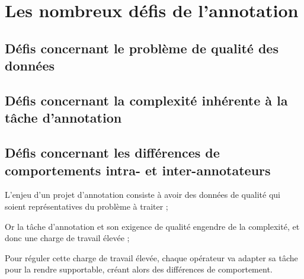 \section{Les nombreux défis de l'annotation}
\label{section:2.3-DEFIS-ANNOTATION}

	
	
	
	\subsection{Défis concernant le problème de qualité des données}
	\label{section:2.3.1-DEFIS-ANNOTATION-ASPECT-DONNEES}
	
	
	\subsection{Défis concernant la complexité inhérente à la tâche d'annotation}
	\label{section:2.3.2-DEFIS-ANNOTATION-ASPECT-COMPLEXITE}
	
	
	\subsection{Défis concernant les différences de comportements intra- et inter-annotateurs}
	\label{section:2.3.3-DEFIS-ANNOTATION-ASPECT-HUMAIN}
	
	
	\begin{leftBarSummary}
		\begin{todolist}
			\item[\itemok] L'enjeu d'un projet d'annotation consiste à avoir des données de qualité qui soient représentatives du problème à traiter ;
			\item[\itemok] Or la tâche d'annotation et son exigence de qualité engendre de la complexité, et donc une charge de travail élevée ;
			\item[\itemok] Pour réguler cette charge de travail élevée, chaque opérateur va adapter sa tâche pour la rendre supportable, créant alors des différences de comportement.
		\end{todolist}
	\end{leftBarSummary}